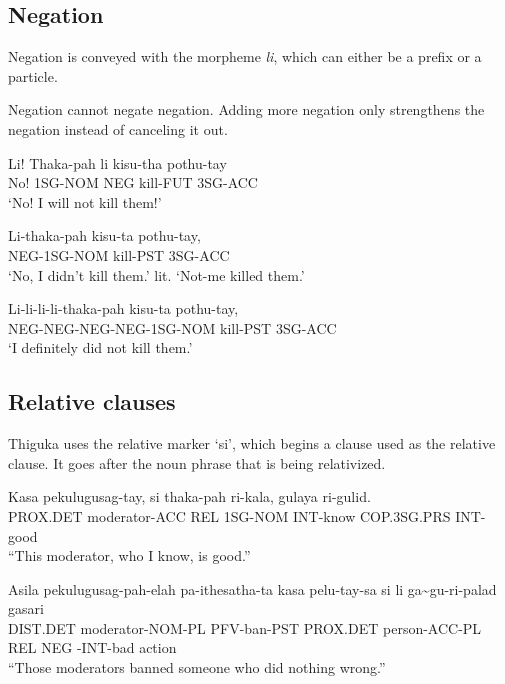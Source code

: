 \subsection{Negation}
Negation is conveyed with the morpheme \emph{li}, which can either be a prefix or a particle.

Negation cannot negate negation.
Adding more negation only strengthens the negation instead of canceling it out.

\begin{exe}
    \ex{} \gll{}Li! Thaka-pah li kisu-tha pothu-tay\\
    No! 1SG-NOM NEG kill-FUT 3SG-ACC\\
    \glt{}`No! I will not kill them!'
\end{exe}

\begin{exe}
    \ex{} \gll{}Li-thaka-pah kisu-ta pothu-tay,\\
    NEG-1SG-NOM kill-PST 3SG-ACC\\
    \glt{}`No, I didn't kill them.'
    \glt{}lit. `Not-me killed them.'
\end{exe}

\begin{exe}
    \ex{} \gll{}Li-li-li-li-thaka-pah kisu-ta pothu-tay,\\
    NEG-NEG-NEG-NEG-1SG-NOM kill-PST 3SG-ACC\\
    \glt{}`I definitely did not kill them.'
\end{exe}

\subsection{Relative clauses}
Thiguka uses the relative marker `si', which begins a clause used as the relative clause.
It goes after the noun phrase that is being relativized.

\begin{exe}
    \ex{} \gll{}Kasa     pekulugusag-tay, si  thaka-pah ri-kala, gulaya      ri-gulid.\\
                PROX.DET moderator-ACC    REL 1SG-NOM   INT-know COP.3SG.PRS INT-good \\
    \glt{}``This moderator, who I know, is good.''
\end{exe}

\begin{exe}
    \ex{} \gll{}Asila    pekulugusag-pah-elah pa-ithesatha-ta kasa pelu-tay-sa       si  li  ga\~{}gu-ri-palad gasari\\
                DIST.DET moderator-NOM-PL     PFV-ban-PST     PROX.DET person-ACC-PL REL NEG \agradj{}-INT-bad action\\
    \glt{}``Those moderators banned someone who did nothing wrong.''
\end{exe}


